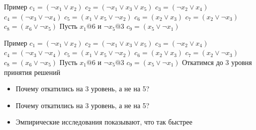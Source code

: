 \documentclass{beamer}
\begin{document}
\begin{frame}{Пример}
$c_1 = (\lnot x_1 \vee x_2 )$\newline
$c_2 = (\lnot x_1 \vee x_3 \vee x_5 )$\newline
$c_3 = (\lnot x_2 \vee x_4 )$\newline
$c_4 = (\lnot x_3 \vee \lnot x_4 )$\newline
$c_5 = (x_1 \vee x_5 \vee \lnot x_2 )$\newline
$c_6 = (x_2 \vee x_3 )$\newline
$c_7 = (x_2 \vee \lnot x_3 )$\newline
$c_8 = (x_6 \vee \lnot x_5 )$\newline
Пусть $x_1@6$ и $\lnot x_5@3$\newline
$c_9 = (x_5 \vee \lnot x_1)$\newline
\end{frame}

\begin{frame}{Пример}
$c_1 = (\lnot x_1 \vee x_2 )$\newline
$c_2 = (\lnot x_1 \vee x_3 \vee x_5 )$\newline
$c_3 = (\lnot x_2 \vee x_4 )$\newline
$c_4 = (\lnot x_3 \vee \lnot x_4 )$\newline
$c_5 = (x_1 \vee x_5 \vee \lnot x_2 )$\newline
$c_6 = (x_2 \vee x_3 )$\newline
$c_7 = (x_2 \vee \lnot x_3 )$\newline
$c_8 = (x_6 \vee \lnot x_5 )$\newline
Пусть $x_1@6$ и $\lnot x_5@3$\newline
$c_9 = (x_5 \vee \lnot x_1)$\newline
Откатимся до 3 уровня принятия решений
\end{frame}

\begin{frame}{}
\begin{itemize}
\item Почему откатились на 3 уровень, а не на 5?
\end{itemize}
\end{frame}

\begin{frame}{}
\begin{itemize}
\item Почему откатились на 3 уровень, а не на 5?
\item Эмпирические исследования показывают, что так быстрее
\end{itemize}
\end{frame}
\end{document}
